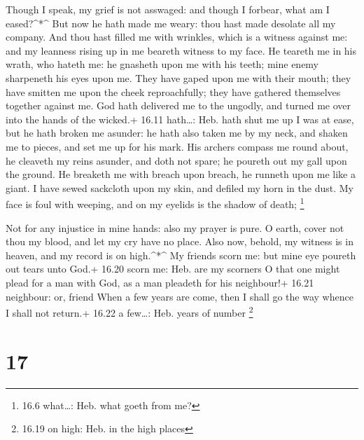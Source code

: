  Though I speak, my grief is not asswaged: and though I
forbear, what am I eased?\^{}*\^{}  But now he hath made me
weary: thou hast made desolate all my company.  And thou
hast filled me with wrinkles, which is a witness against me: and my
leanness rising up in me beareth witness to my face.  He
teareth me in his wrath, who hateth me: he gnasheth upon me with his
teeth; mine enemy sharpeneth his eyes upon me.  They have
gaped upon me with their mouth; they have smitten me upon the cheek
reproachfully; they have gathered themselves together against me.
 God hath delivered me to the ungodly, and turned me over
into the hands of the wicked.+ 16.11 hath\ldots: Heb. hath shut me up
 I was at ease, but he hath broken me asunder: he hath also
taken me by my neck, and shaken me to pieces, and set me up for his
mark.  His archers compass me round about, he cleaveth my
reins asunder, and doth not spare; he poureth out my gall upon the
ground.  He breaketh me with breach upon breach, he runneth
upon me like a giant.  I have sewed sackcloth upon my skin,
and defiled my horn in the dust.  My face is foul with
weeping, and on my eyelids is the shadow of death; \footnote{16.6
  what\ldots: Heb. what goeth from me?}

 Not for any injustice in mine hands: also my prayer is
pure.  O earth, cover not thou my blood, and let my cry
have no place.  Also now, behold, my witness is in heaven,
and my record is on high.\^{}*\^{}  My friends scorn me:
but mine eye poureth out tears unto God.+ 16.20 scorn me: Heb. are my
scorners  O that one might plead for a man with God, as a
man pleadeth for his neighbour!+ 16.21 neighbour: or, friend
 When a few years are come, then I shall go the way whence
I shall not return.+ 16.22 a few\ldots: Heb. years of number \footnote{16.19
  on high: Heb. in the high places}

\hypertarget{section-16}{%
\section{17}\label{section-16}}

